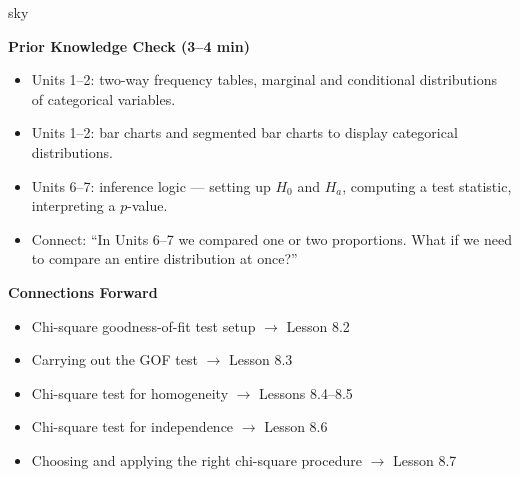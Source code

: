 \documentclass[10pt]{article}
\begin{document}
\begin{skillbox}{sky}
\begin{minipage}[t]{0.48\linewidth}
    \textbf{Prior Knowledge Check (3--4 min)}
    \begin{itemize}
        \item Units 1--2: two-way frequency tables, marginal and conditional
              distributions of categorical variables.
        \item Units 1--2: bar charts and segmented bar charts to display
              categorical distributions.
        \item Units 6--7: inference logic --- setting up $H_0$ and $H_a$,
              computing a test statistic, interpreting a $p$-value.
        \item Connect: ``In Units 6--7 we compared one or two proportions.
              What if we need to compare an entire distribution at once?''
    \end{itemize}
\end{minipage}
\hfill
\begin{minipage}[t]{0.48\linewidth}
    \textbf{Connections Forward}
    \begin{itemize}
        \item Chi-square goodness-of-fit test setup $\to$ Lesson 8.2
        \item Carrying out the GOF test $\to$ Lesson 8.3
        \item Chi-square test for homogeneity $\to$ Lessons 8.4--8.5
        \item Chi-square test for independence $\to$ Lesson 8.6
        \item Choosing and applying the right chi-square procedure $\to$ Lesson 8.7
    \end{itemize}
\end{minipage}
\end{skillbox}
\end{document}
